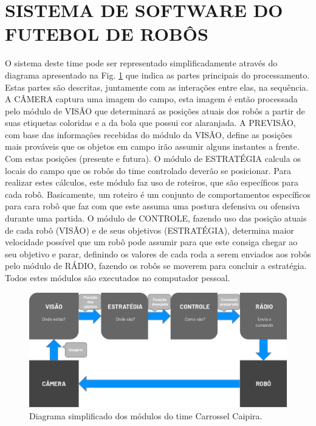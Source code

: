 \section{SISTEMA DE SOFTWARE DO FUTEBOL DE ROBÔS}

O sistema deste time pode ser representado simplificadamente através do diagrama apresentado na Fig. \ref{fig:esquema_software} que indica as partes principais do processamento. Estas partes são descritas, juntamente com as interações entre elas, na sequência. A CÂMERA captura uma imagem do campo, esta imagem é então processada pelo módulo de VISÃO que determinará as posições atuais dos robôs a partir de suas etiquetas coloridas e a da bola que possui cor alaranjada. A PREVISÃO, com base das informações recebidas do módulo da VISÃO, define as posições mais prováveis que os objetos em campo irão assumir alguns instantes a frente. Com estas posições (presente e futura). O módulo de ESTRATÉGIA calcula os locais do campo que os robôs do time controlado deverão se posicionar. Para realizar estes cálculos, este módulo faz uso de roteiros, que são específicos para cada robô. Basicamente, um roteiro é um conjunto de comportamentos específicos para cara robô que faz com que este assuma uma postura defensiva ou ofensiva durante uma partida. O módulo de CONTROLE, fazendo uso das posição atuais de cada robô (VISÃO) e de seus objetivos (ESTRATÉGIA), determina maior velocidade possível que um robô pode assumir para que este consiga chegar ao seu objetivo e parar, definindo os valores de cada roda a serem enviados aos robôs pelo módulo de RÁDIO, fazendo os robôs se moverem para concluir a estratégia. Todos estes módulos são executados no computador pessoal.

\begin{figure}[!htb]
    \centering
        \includegraphics[scale=0.29]{imagens/diagrama.png}
        \caption{Diagrama simplificado dos módulos do time Carrossel Caipira.}
    \label{fig:esquema_software}
\end{figure}

